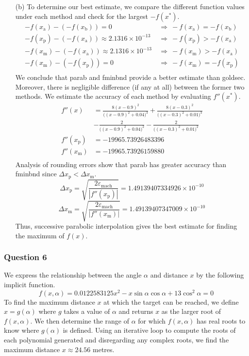 \documentclass[11pt,a4paper]{article}
\begin{document}
\begin{enumerate}
\begin{enumerate}
	\end{enumerate}
	\item[(b)] To determine our best estimate, we compare the different function values under each method and check for the largest $-f(x^*)$.
	\begin{align*}
		-f(x_{\text{a}})-(-f(x_{\text{b}}))=0 \ &\Rightarrow \ -f(x_{\text{a}}) = -f(x_{\text{b}}) \\
		-f(x_{\text{p}})-(-f(x_{\text{a}})) \approx 2.1316 \times 10^{-13} \ &\Rightarrow \ -f(x_{\text{p}})> -f(x_{\text{a}})  \\
		-f(x_{\text{m}})-(-f(x_{\text{a}}))  \approx 2.1316 \times 10^{-13} \ &\Rightarrow \ -f(x_{\text{m}}) > -f(x_{\text{a}})  \\
		-f(x_{\text{m}})-(-f(x_{\text{p}}))=0 \ &\Rightarrow \ -f(x_{\text{m}}) = -f(x_{\text{p}}) \\
	\end{align*}
	We conclude that parab and fminbnd provide a better estimate than goldsec. Moreover, there is negligible difference (if any at all) between the former two methods. We estimate the accuracy of each method by evaluating $f''(x^*)$.
	\begin{align*}
		f''(x)&=\frac{8(x-0.9)^2}{\big((x-0.9)^2+0.04\big)^3}+\frac{8(x-0.3)^2}{\big((x-0.3)^2+0.01\big)^3} \\
		&-\frac{2}{\big((x-0.9)^2+0.04\big)^2}-\frac{2}{\big((x-0.3)^2+0.01\big)^2} \\
		f''(x_{\text{p}})&=-19965.73926483396 \\
		f''(x_{\text{m}})&=-19965.73926159880 \\
	\end{align*}
	Analysis of rounding errors show that parab has greater accuracy than fminbnd since $\Delta x_{\text{p}} < \Delta x_{\text{m}}$.
	$$\Delta x_{\text{p}}=\sqrt{\frac{2\varepsilon_{\text{mach}}}{|f''(x_{\text{p}})|}}=1.49139407334926 \times 10^{-10}$$
	$$\Delta x_{\text{m}}=\sqrt{\frac{2\varepsilon_{\text{mach}}}{|f''(x_{\text{m}})|}}=1.49139407347009 \times 10^{-10}$$
	Thus, successive parabolic interpolation gives the best estimate for finding the maximum of $f(x)$.
\end{enumerate}

\subsubsection*{Question 6}
We express the relationship between the angle $\alpha$ and distance $x$ by the following implicit function.
$$f(x,\alpha)=0.0122583125x^2-x\sin\alpha\cos\alpha+13\cos^2\alpha=0$$
To find the maximum distance $x$ at which the target can be reached, we define $x=g(\alpha)$ where $g$ takes a value of $\alpha$ and returns $x$ as the larger root of $f(x,\alpha)$. We then determine the range of $\alpha$ for which $f(x,\alpha)$ has real roots to know where $g(\alpha)$ is defined. Using an iterative loop to compute the roots of each polynomial generated and disregarding any complex roots, we find the maximum distance $x \approx 24.56$ metres.
\end{document}
